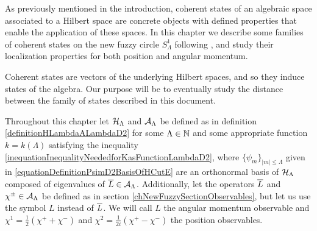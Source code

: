 










As previously mentioned in the introduction, coherent states of an algebraic space associated to a Hilbert space  are concrete objects with defined properties that enable the application of these spaces. In this chapter we describe some families of coherent states on the new fuzzy circle $S^1_\Lambda$ following \cite{FioreCoherent2020, FioreXi2020, FioreTheCase2020}, and study their localization properties for both position and angular momentum. 

Coherent states are vectors of the underlying Hilbert spaces, and so they induce states of the algebra. Our purpose will be to eventually study the distance between the family of states described in this document.

Throughout this chapter let $\mathcal H_\Lambda$ and $\mathcal A_\Lambda$ be defined as in definition \ref{definitionHLambdaALambdaD2} for some $\Lambda \in \mathbb{N}$ and some appropriate function $k = k(\Lambda)$ satisfying the inequality \eqref{inequationInequalityNeededforKasFunctionLambdaD2}, where $\{\psi_m\}_{|m| \leq \Lambda}$ given in \eqref{equationDefinitionPsimD2BasisOfHCutE} are an orthonormal basis of $\mathcal H_\Lambda$ composed of eigenvalues of $\overline{L} \in \mathcal A_\Lambda$. Additionally, let the operators $\overline{L}$ and $\chi^\pm \in \mathcal A_\Lambda$ be defined as in section \ref{chNewFuzzySectionObservables}, but let us use the symbol $L$ instead of $\overline{L}$. We will call $L$ the angular momentum observable and $\chi^1 = \frac{1}{2}(\chi^+ + \chi^-)$ and $\chi^2 = \frac{1}{2i}(\chi^+ - \chi^-)$ the position observables.

